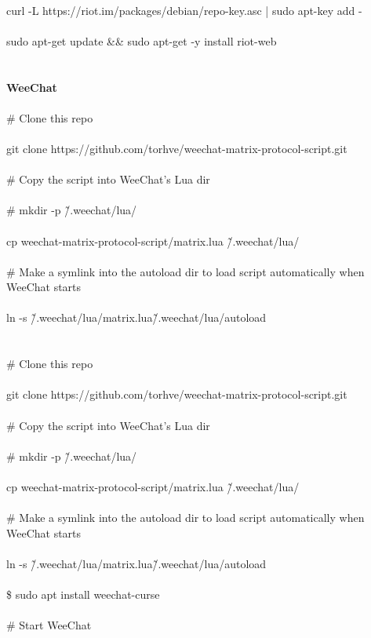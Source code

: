 \documentclass[10pt,a4paper]{article}
\begin{document}
{{{{{{{{{{{{{{{\\
curl -L https://riot.im/packages/debian/repo-key.asc | sudo apt-key add -\\
\\
sudo apt-get update \&\& sudo apt-get -y install riot-web \\
\\
\\
\textbf{WeeChat}\\
\\
\# Clone this repo\\
\\
git clone https://github.com/torhve/weechat-matrix-protocol-script.git\\
\\
\# Copy the script into WeeChat's Lua dir\\
\\
\# mkdir -p \~/.weechat/lua/\\
\\
cp weechat-matrix-protocol-script/matrix.lua \~/.weechat/lua/\\
\\
\# Make a symlink into the autoload dir to load script automatically when WeeChat starts\\
\\
ln -s \~/.weechat/lua/matrix.lua\~/.weechat/lua/autoload\\
\\
\\
\# Clone this repo\\
\\
git clone https://github.com/torhve/weechat-matrix-protocol-script.git\\
\\
\# Copy the script into WeeChat's Lua dir\\
\\
\# mkdir -p \~/.weechat/lua/\\
\\
cp weechat-matrix-protocol-script/matrix.lua \~/.weechat/lua/\\
\\
\# Make a symlink into the autoload dir to load script automatically when WeeChat starts\\
\\
ln -s \~/.weechat/lua/matrix.lua\~/.weechat/lua/autoload\\
\\
\$ sudo apt install weechat-curse\\
\\
\# Start WeeChat\\
}}}}}}}}}}}}}}}
\end{document}
